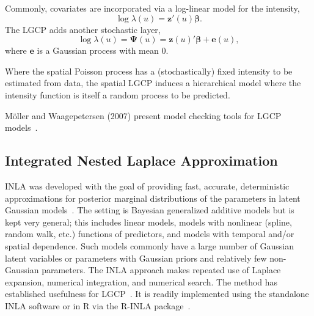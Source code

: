 \documentclass[]{interact}
\begin{document}
Commonly, covariates are incorporated via a log-linear model for the intensity,
\begin{displaymath}
\log\lambda(u) = \mathbf{z}'(u) \boldsymbol{\beta}.
\end{displaymath}
The LGCP adds another stochastic layer,
\begin{displaymath}
\log\lambda(u) = \boldsymbol{\Psi}(u)
= \mathbf{z}(u)' \boldsymbol{\beta} + \mathbf{e}(u),
\end{displaymath}
where \(\mathbf{e}\) is a Gaussian process with mean 0.

Where the spatial Poisson process has a (stochastically) fixed intensity to be
estimated from data, the spatial LGCP induces a hierarchical model where the
intensity function is itself a random process to be predicted.


M\"{o}ller and Waagepetersen (2007) present model checking tools for LGCP
models~\cite{moellerwaagepetersen}.


\subsection{Integrated Nested Laplace Approximation}

INLA was developed with the goal of providing fast, accurate, deterministic
approximations for posterior marginal distributions of the parameters in
latent Gaussian models~\cite{rueetal}. The setting is Bayesian generalized
additive models but is kept very general; this includes linear models, models
with nonlinear (spline, random walk, etc.) functions of predictors, and models
with temporal and/or spatial dependence. Such models commonly have a large
number of Gaussian latent variables or parameters with Gaussian priors and
relatively few non-Gaussian parameters. The INLA approach makes repeated use
of Laplace expansion, numerical integration, and numerical search. The method
has established usefulness for LGCP~\cite{illianetal}. It is readily
implemented using the standalone INLA software or in R via the
R-INLA package~\cite{inlar}.



\end{document}
